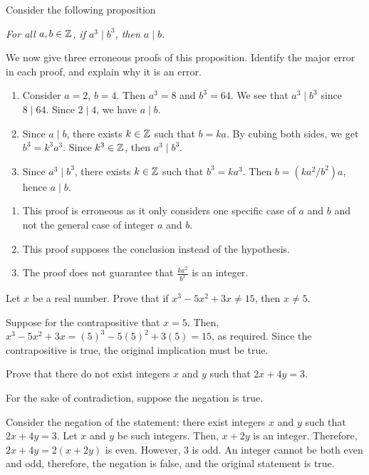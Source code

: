 \begin{warmup}
  Consider the following proposition
  \begin{center}
    \emph{For all $a,b\in\mathbb{Z}$, if $a^3 \mid b^3$, then $a \mid b$.}
  \end{center}
  We now give three erroneous proofs of this proposition.
  Identify the major error in each proof, and explain why it is an error.
  \begin{enumerate}
    \item Consider $a = 2$, $b = 4$. Then $a^3 = 8$ and $b^3 = 64$. We see that $a^3 \mid b^3$ since $8 \mid 64$. Since $2 \mid 4$, we have $a \mid b$.
    \item Since $a \mid b$, there exists $k\in\mathbb{Z}$ such that $b=ka$. By cubing both sides, we get $b^3 = k^3a^3$. Since $k^3\in\mathbb{Z}$, then $a^3\mid b^3$.
    \item Since $a^3 \mid b^3$, there exists $k\in\mathbb{Z}$ such that $b^3=ka^3$. Then $b=(ka^2/b^2)a$, hence $a \mid b$.
  \end{enumerate}
\end{warmup}
\begin{sol}
  \begin{enumerate}
    \item This proof is erroneous as it only considers one specific case of $a$ and $b$ and not the general case of integer $a$ and $b$.
    \item This proof supposes the conclusion instead of the hypothesis.
    \item The proof does not guarantee that $\frac{ka^2}{b^2}$ is an integer.
          \qedhere
  \end{enumerate}
\end{sol}


\begin{warmup}
  Let $x$ be a real number. Prove that if $x^3-5x^2+3x \neq 15$, then $x \neq 5$.
\end{warmup}
\begin{prf}
  Suppose for the contrapositive that $x=5$.
  Then, $x^3-5x^2+3x=(5)^3-5(5)^2+3(5)=15$, as required.
  Since the contrapositive is true, the original implication must be true.
\end{prf}

\begin{warmup}
  Prove that there do not exist integers $x$ and $y$ such that $2x + 4y = 3$.
\end{warmup}
\begin{prf}
  For the sake of contradiction, suppose the negation is true.

  Consider the negation of the statement: there exist integers $x$ and $y$ such that $2x + 4y = 3$.
  Let $x$ and $y$ be such integers.
  Then, $x+2y$ is an integer.
  Therefore, $2x+4y=2(x+2y)$ is even.
  However, 3 is odd.
  An integer cannot be both even and odd, therefore, the negation is false, and the original statement is true.
\end{prf}


